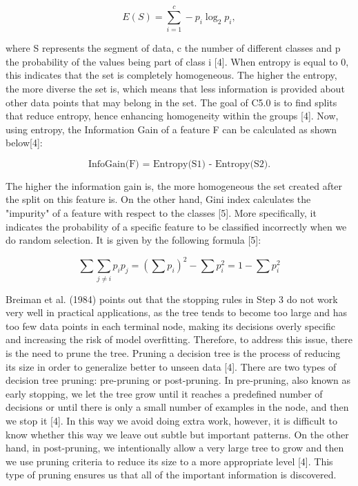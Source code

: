 \documentclass{usiinftr}
\begin{document}
\begin{equation}
E(S)=\sum_{i=1}^{c}-p_{i} \log _{2} p_{i},
\end{equation}

where S represents the segment of data, c the number of different classes and p the probability of the values being part of class i [4]. When entropy is equal to 0, this indicates that the set is completely homogeneous. The higher the entropy, the more diverse the set is, which means that less information is provided about other data points that may belong in the set. The goal of C5.0 is to find splits that reduce entropy,  hence enhancing homogeneity within the groups [4]. Now, using entropy, the Information Gain of a feature F can be calculated as shown below[4]:

\begin{equation}
\text{InfoGain(F) = Entropy(S1) - Entropy(S2).}
\end{equation}

The higher the information gain is, the more homogeneous the set created after the split on this feature is. On the other hand, Gini index calculates the "impurity" of a feature with respect to the classes [5]. More specifically, it indicates the probability of a specific feature to be classified incorrectly when we do random selection. It is given by the following formula [5]:

\begin{equation}
\sum \sum_{j \neq i} p_{i} p_{j}=\left(\sum p_{i}\right)^{2}-\sum p_{i}^{2}=1-\sum p_{i}^{2}
\end{equation}

Breiman et al. (1984) points out that the stopping rules in Step 3 do not work very well in practical applications, as the tree tends to become too large and has too few data points in each terminal node, making its decisions overly specific and increasing the risk of model overfitting. Therefore, to address this issue, there is the need to prune the tree. Pruning a decision tree is the process of reducing its size in order to generalize better to unseen data [4]. There are two types of decision tree pruning: pre-pruning or post-pruning. In pre-pruning, also known as early stopping, we let the tree grow until it reaches a predefined number of decisions or until there is only a small number of examples in the node, and then we stop it [4]. In this way we avoid doing extra work, however, it is difficult to know whether this way we leave out subtle but important patterns. On the other hand, in post-pruning, we intentionally allow a very large tree to grow and then we use pruning criteria to reduce its size to a more appropriate level [4]. This type of pruning ensures us that all of the important information is discovered. 
	
\end{document}
